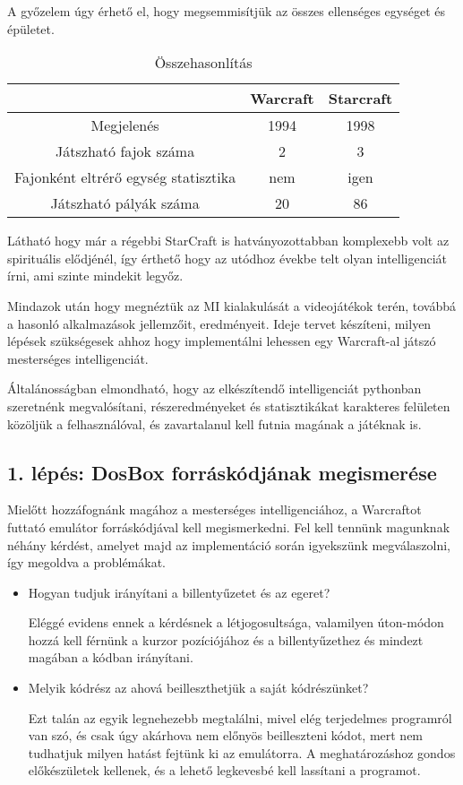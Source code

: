 A győzelem úgy érhető el, hogy megsemmisítjük az összes ellenséges egységet és épületet.
\begin{table}[h]
    \centering
    \caption{Összehasonlítás}
    \label{tab:osszehasonlitas}
    \begin{tabular}{|c|c|c|}
    \hline
    ~ & Warcraft & Starcraft \\
    \hline
    Megjelenés & 1994 & 1998 \\
    Játszható fajok száma & 2 & 3 \\
    Fajonként eltrérő egység statisztika & nem & igen \\
    Játszható pályák száma & 20 & 86 \\
    \hline
    \end{tabular}
\end{table}

Látható hogy már a régebbi StarCraft is hatványozottabban komplexebb volt az spirituális elődjénél, így érthető hogy az utódhoz évekbe telt olyan intelligenciát írni, ami szinte mindekit legyőz.


Mindazok után hogy megnéztük az MI kialakulását a videojátékok terén, továbbá a hasonló alkalmazások jellemzőit, eredményeit. Ideje tervet készíteni, milyen lépések szükségesek ahhoz hogy implementálni lehessen egy Warcraft-al játszó mesterséges intelligenciát.

Általánosságban elmondható, hogy az elkészítendő intelligenciát pythonban szeretnénk megvalósítani, részeredményeket és statisztikákat karakteres felületen közöljük a felhasználóval, és zavartalanul kell futnia magának a játéknak is.

\subsection{1. lépés: DosBox forráskódjának megismerése}

Mielőtt hozzáfognánk magához a mesterséges intelligenciához, a Warcraftot futtató emulátor forráskódjával kell megismerkedni. Fel kell tennünk magunknak néhány kérdést, amelyet majd az implementáció során igyekszünk megválaszolni, így megoldva a problémákat.

\begin{itemize}
    \item Hogyan tudjuk irányítani a billentyűzetet és az egeret?
    
    Eléggé evidens ennek a kérdésnek a létjogosultsága, valamilyen úton-módon hozzá kell férnünk a kurzor pozíciójához és a billentyűzethez és mindezt magában a kódban irányítani.  
    \item Melyik kódrész az ahová beilleszthetjük a saját kódrészünket?
    
    Ezt talán az egyik legnehezebb megtalálni, mivel elég terjedelmes programról van szó, és csak úgy akárhova nem előnyös beilleszteni kódot, mert nem tudhatjuk milyen hatást fejtünk ki az emulátorra. A meghatározáshoz gondos előkészületek kellenek, és a lehető legkevesbé kell lassítani a programot.
\end{itemize}

